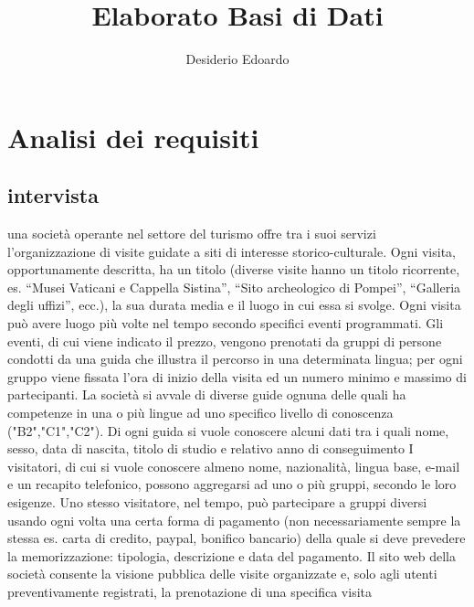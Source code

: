 \documentclass[a4paper,12pt]{report}
\title{Elaborato Basi di Dati}
\author{Desiderio Edoardo}
\begin{document}
\maketitle
\titlepage
\tableofcontents
\newpage

\chapter{Analisi dei requisiti}

\section{intervista}
una	 società	 operante	 nel	 settore	 del	 turismo	 offre	 tra	 i	 suoi	 servizi	 l’organizzazione	 di	 	 visite	
guidate	a	siti	di	interesse	storico-culturale.
Ogni	visita,	opportunamente	descritta,	ha	un	 titolo	 (diverse	visite	hanno	un	 titolo	 ricorrente,	es.	
“Musei	Vaticani	e	Cappella	Sistina”,	“Sito	archeologico	di	Pompei”,	“Galleria	degli	uffizi”,	ecc.),	la	
sua	durata	media		e	il	luogo		in	cui	essa	si	svolge.	Ogni	visita	può	avere	luogo	più	volte	nel	tempo	
secondo	specifici	eventi	programmati.
Gli	eventi,	di	cui	viene	indicato	il	prezzo,	vengono	prenotati	da	gruppi	di	persone	condotti	da	una	
guida	che	illustra	il	percorso	in	una	determinata	lingua;	per	ogni	gruppo	viene	fissata	l’ora	di	inizio	
della	visita	ed	un	numero	minimo	e	massimo	di	partecipanti.
La	società	si	avvale	di	diverse	guide	ognuna	delle	quali	ha	competenze	in	una	o	più	lingue	ad	uno	
specifico	 livello	 di	 conoscenza	 ("B2","C1","C2").	 	 Di	 ogni	 guida	 si	 vuole	
conoscere	 alcuni	 dati	 tra	 i	 quali	 nome,	 sesso,	 data	 di	 nascita,	 titolo	 di	 studio	 e	 relativo	 anno	 di	
conseguimento
I	visitatori,	di	cui	si	vuole	conoscere	almeno	nome,	nazionalità,	lingua	base,	e-mail	e	un	 recapito	
telefonico,	 possono	 aggregarsi	 ad	 uno	 o	 più	 gruppi,	 secondo	 le	 loro	 esigenze.	 Uno	 stesso	
visitatore,	 nel	 tempo,	 può	 partecipare	 a	 gruppi	 diversi	 usando	 ogni	 volta	 una	 certa	 forma	 di	
pagamento	(non	necessariamente	sempre	la	stessa	es.	carta	di	credito,	paypal,	bonifico	bancario)	
della	quale	si	deve	prevedere	la	memorizzazione:	tipologia,	descrizione	e	data	del	pagamento.
Il	 sito	 web	 della	 società	 consente	 la	 visione	 pubblica	 delle	 visite	 organizzate	 e,	 solo	 agli	 utenti	
preventivamente	registrati,	la	prenotazione	di	una	specifica	visita
\end{document}
